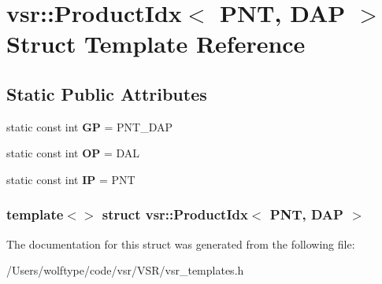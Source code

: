 \hypertarget{structvsr_1_1_product_idx_3_01_p_n_t_00_01_d_a_p_01_4}{\section{vsr\-:\-:Product\-Idx$<$ P\-N\-T, D\-A\-P $>$ Struct Template Reference}
\label{structvsr_1_1_product_idx_3_01_p_n_t_00_01_d_a_p_01_4}
}
\subsection*{Static Public Attributes}
\begin{DoxyCompactItemize}
\item 
\hypertarget{structvsr_1_1_product_idx_3_01_p_n_t_00_01_d_a_p_01_4_a5d62a526b1e080f12daadf96c6a97302}{static const int {\bfseries G\-P} = P\-N\-T\-\_\-\-D\-A\-P}\label{structvsr_1_1_product_idx_3_01_p_n_t_00_01_d_a_p_01_4_a5d62a526b1e080f12daadf96c6a97302}

\item 
\hypertarget{structvsr_1_1_product_idx_3_01_p_n_t_00_01_d_a_p_01_4_a56ea1019018d5573ea101c1d15f1eda1}{static const int {\bfseries O\-P} = D\-A\-L}\label{structvsr_1_1_product_idx_3_01_p_n_t_00_01_d_a_p_01_4_a56ea1019018d5573ea101c1d15f1eda1}

\item 
\hypertarget{structvsr_1_1_product_idx_3_01_p_n_t_00_01_d_a_p_01_4_a6d6a77e2e31958b1fa170f374cd6f320}{static const int {\bfseries I\-P} = P\-N\-T}\label{structvsr_1_1_product_idx_3_01_p_n_t_00_01_d_a_p_01_4_a6d6a77e2e31958b1fa170f374cd6f320}

\end{DoxyCompactItemize}
\subsubsection*{template$<$$>$ struct vsr\-::\-Product\-Idx$<$ P\-N\-T, D\-A\-P $>$}



The documentation for this struct was generated from the following file\-:\begin{DoxyCompactItemize}
\item 
/\-Users/wolftype/code/vsr/\-V\-S\-R/vsr\-\_\-templates.\-h\end{DoxyCompactItemize}
